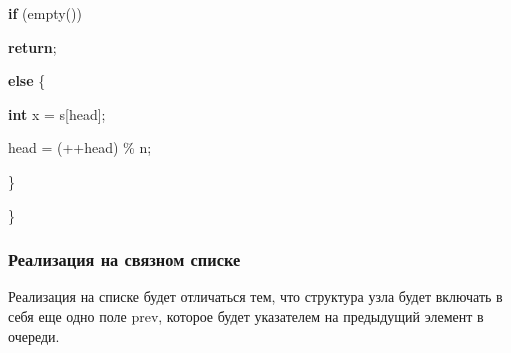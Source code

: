 \begin{algorithm}
\begin{algorithmic}
		\State \hspace{1cm} \textbf{if} (empty())

		\State \hspace{2cm} \textbf{return};

		\State \hspace{1cm} \textbf{else} \{

		\State \hspace{2cm} \textbf{int} x = s[head];

		\State \hspace{2cm} head = (++head) \% n;

		\State \hspace{1cm} \}

		\State \}

	\end{algorithmic}
\end{algorithm}



\subsubsection{Реализация на связном списке}
Реализация на списке будет отличаться тем, что структура узла будет включать в себя еще одно поле prev, которое будет указателем на предыдущий элемент в очереди.\\



